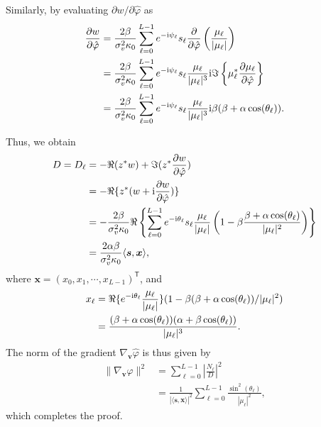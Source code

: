 \documentclass[a4paper,12pt]{article}
\def \T {^{\mathsf{T}}}
\def \ri {{\rm i}}
\begin{document}
Similarly, by evaluating $\partial w/\partial \hat{\varphi}$ as 
\begin{equation}
    \begin{aligned}
    \frac{\partial w}{\partial \hat{\varphi}} &= \frac{2\beta}{\sigma_v^2 \kappa_0} \sum_{\ell=0}^{L-1} e^{-\ri \psi_\ell} s_\ell \frac{\partial}{\partial \hat{\varphi}}\left(\frac{\mu_\ell}{|\mu_\ell|}\right) \\
    &= \frac{2\beta}{\sigma_v^2 \kappa_0} \sum_{\ell=0}^{L-1} e^{-\ri \psi_\ell} s_\ell  \frac{\mu_\ell}{|\mu_\ell|^3} {\ri} \Im \left\{\mu_\ell^* \frac{\partial \mu_\ell}{\partial \hat{\varphi}}  \right\} \\
    &=  \frac{2\beta}{\sigma_v^2 \kappa_0} \sum_{\ell=0}^{L-1} e^{-\ri \psi_\ell} s_\ell  \frac{\mu_\ell}{|\mu_\ell|^3} {\ri} \beta(\beta + \alpha\cos(\theta_\ell)). 
    \end{aligned}
\end{equation}

Thus, we obtain 
\begin{equation}
    \begin{aligned}
    D = D_\ell &= -\Re(z^*w) +\Im(z^* \frac{\partial w}{\partial \hat{\varphi}}) \\
    &= -\Re\{z^*(w+\ri \frac{\partial w}{\partial \hat{\varphi}})\} \\
    &= -\frac{2\beta}{\sigma_v^2 \kappa_0} \Re\left\{ \sum_{\ell=0}^{L-1}e^{-\ri \theta_\ell} s_\ell \frac{\mu_\ell}{|\mu_\ell|}\left( 1-\beta\frac{\beta+\alpha\cos(\theta_\ell)}{|\mu_\ell|^2} \right) \right\} \\
    &= \frac{2\alpha\beta}{\sigma_v^2 \kappa_0} \langle {\bm s}, {\bm x} \rangle,
    \end{aligned}
\end{equation}
where ${\bm x} = (x_0, x_1, \cdots, x_{L-1})\T$, and 
\begin{equation}
    \begin{aligned}
        x_\ell &= \Re\{ e^{-\ri \theta_\ell} \frac{\mu_\ell}{|\mu_\ell|} \}(1- \beta(\beta+\alpha\cos(\theta_\ell))/|\mu_\ell|^2) \\
        &= \frac{(\beta+\alpha\cos(\theta_\ell))(\alpha+\beta\cos(\theta_\ell))}{|\mu_\ell|^3}. 
    \end{aligned}
\end{equation}
The norm of the gradient $\nabla_{\bm v}\hat{\varphi}$ is thus given by 
\begin{equation}
    \begin{aligned}
    \|\nabla_{\bm v}\hat{\varphi}\|^2 &= \sum_{\ell=0}^{L-1}\left| \frac{N_\ell}{D} \right|^2 \\
    &= \frac{1}{|\langle {\bm s}, {\bm x}\rangle|^2}\sum_{\ell=0}^{L-1}  \frac{\sin^2(\theta_\ell)}{|\mu_\ell|^2},  
    \end{aligned}
\end{equation}
which completes the proof. 
\end{document}
